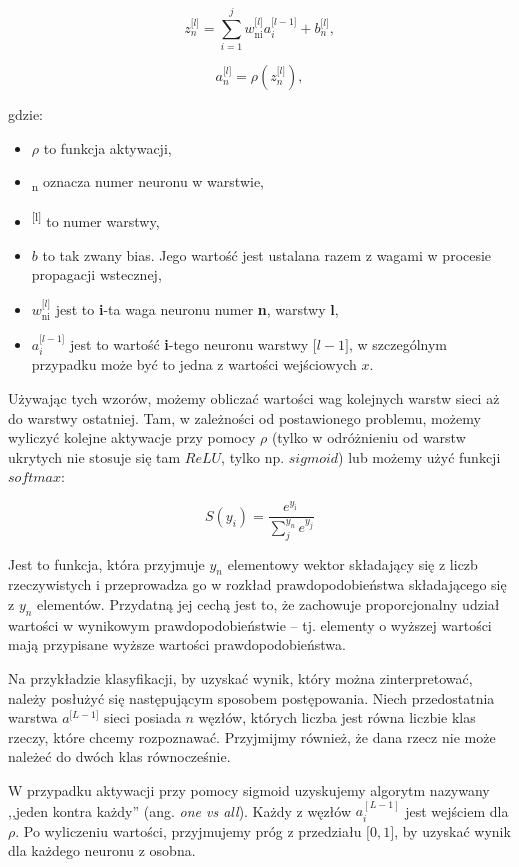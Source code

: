 \[z_{n}^{\lbrack l\rbrack}=\sum_{i=1}^{j}{w_{\text{ni}}^{\lbrack l\rbrack}a_{i}^{\lbrack l - 1\rbrack} + b_{n}^{\lbrack l\rbrack}},\tag{1}\]

\[a_{n}^{\lbrack l\rbrack}=\rho(z_{n}^{\lbrack l\rbrack}),\tag{2}\]

gdzie:
\begin{itemize}
\item \(\rho\) to funkcja aktywacji,
\item \textsubscript{n} oznacza numer neuronu w warstwie,
\item \textsuperscript{{[}l{]}} to numer warstwy,
\item \(b\) to tak zwany bias. Jego wartość jest ustalana razem z wagami w procesie propagacji wstecznej,
\item \(w_{\text{ni}}^{\lbrack l\rbrack}\) jest to \textbf{i}-ta waga neuronu numer \textbf{n}, warstwy \textbf{l},
\item \(a_{i}^{\lbrack l - 1\rbrack}\) jest to wartość \textbf{i}-tego neuronu warstwy \({[}l-1{]}\), w szczególnym przypadku może być to jedna z wartości wejściowych \(x\).
\end{itemize}

Używając tych wzorów, możemy obliczać wartości wag kolejnych warstw sieci aż do warstwy ostatniej.
Tam, w zależności od postawionego problemu, możemy wyliczyć kolejne aktywacje przy pomocy \(\rho\) (tylko w odróżnieniu od warstw ukrytych nie stosuje się tam \(ReLU\), tylko np. \(sigmoid\)) lub możemy użyć funkcji \(softmax\):

\[S(y_{i}) = \frac{e^{y_{\text{i\ }}}}{\sum_{j}^{y_{n}}e^{y_{j}}} \tag{3}\]

Jest to funkcja, która przyjmuje \(y_{n}\) elementowy wektor składający się z liczb rzeczywistych i przeprowadza go w rozkład prawdopodobieństwa składającego się z \(y_{n}\) elementów. Przydatną jej cechą jest to, że zachowuje proporcjonalny udział wartości w wynikowym prawdopodobieństwie -- tj. elementy o wyższej wartości mają przypisane wyższe wartości prawdopodobieństwa.

Na przykładzie klasyfikacji, by uzyskać wynik, który można zinterpretować, należy posłużyć się następującym sposobem postępowania. Niech przedostatnia warstwa \(a^{\lbrack L - 1\rbrack}\) sieci posiada \(n\) węzłów, których liczba jest równa liczbie klas rzeczy, które chcemy rozpoznawać. Przyjmijmy również, że dana rzecz nie może należeć do dwóch klas równocześnie.

W przypadku aktywacji przy pomocy sigmoid uzyskujemy algorytm nazywany ,,jeden kontra każdy'' (ang. \textit{one vs all}). Każdy z węzłów \(a_{i}^{\left\lbrack L - 1 \right\rbrack}\) jest wejściem dla \(\rho\). Po wyliczeniu wartości, przyjmujemy próg z przedziału \({[}0, 1{]}\), by uzyskać wynik dla każdego neuronu z osobna.


